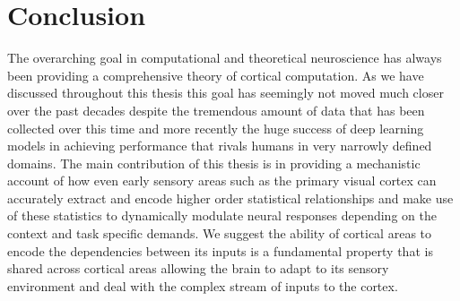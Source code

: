 \chapter{Conclusion}

The overarching goal in computational and theoretical neuroscience has
always been providing a comprehensive theory of cortical
computation. As we have discussed throughout this thesis this goal has
seemingly not moved much closer over the past decades despite the
tremendous amount of data that has been collected over this time and
more recently the huge success of deep learning models in achieving
performance that rivals humans in very narrowly defined domains. The
main contribution of this thesis is in providing a mechanistic account
of how even early sensory areas such as the primary visual cortex can
accurately extract and encode higher order statistical relationships
and make use of these statistics to dynamically modulate neural
responses depending on the context and task specific demands. We
suggest the ability of cortical areas to encode the dependencies
between its inputs is a fundamental property that is shared across
cortical areas allowing the brain to adapt to its sensory environment
and deal with the complex stream of inputs to the cortex.
